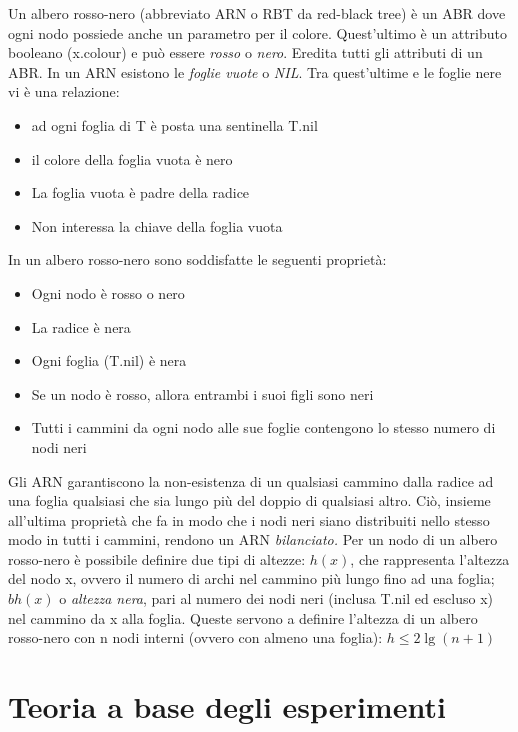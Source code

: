\documentclass[
]{article}
\begin{document}
Un albero rosso-nero (abbreviato ARN o RBT da red-black tree) è un ABR
dove ogni nodo possiede anche un parametro per il colore. Quest'ultimo è
un attributo booleano (x.colour) e può essere \emph{rosso} o
\emph{nero}. Eredita tutti gli attributi di un ABR. In un ARN esistono
le \emph{foglie vuote} o \emph{NIL}. Tra quest'ultime e le foglie nere
vi è una relazione:

\begin{itemize}
\item
  ad ogni foglia di T è posta una sentinella T.nil
\item
  il colore della foglia vuota è nero
\item
  La foglia vuota è padre della radice
\item
  Non interessa la chiave della foglia vuota~~~
\end{itemize}

In un albero rosso-nero sono soddisfatte le seguenti proprietà:

\begin{itemize}
\item
  Ogni nodo è rosso o nero
\item
  La radice è nera
\item
  Ogni foglia (T.nil) è nera
\item
  Se un nodo è rosso, allora entrambi i suoi figli sono neri
\item
  Tutti i cammini da ogni nodo alle sue foglie contengono lo stesso
  numero di nodi neri
\end{itemize}

Gli ARN garantiscono la non-esistenza di un qualsiasi cammino dalla
radice ad una foglia qualsiasi che sia lungo più del doppio di qualsiasi
altro. Ciò, insieme all'ultima proprietà che fa in modo che i nodi neri
siano distribuiti nello stesso modo in tutti i cammini, rendono un ARN
\emph{bilanciato.} Per un nodo di un albero rosso-nero è possibile
definire due tipi di altezze: \(h(x)\), che rappresenta l'altezza del
nodo x, ovvero il numero di archi nel cammino più lungo fino ad una
foglia; \(bh(x)\) o \emph{altezza nera}, pari al numero dei nodi neri
(inclusa T.nil ed escluso x) nel cammino da x alla foglia. Queste
servono a definire l'altezza di un albero rosso-nero con n nodi interni
(ovvero con almeno una foglia): \(h \leq 2 \lg(n+1)\)

\hypertarget{teoria-a-base-degli-esperimenti}{%
\section{Teoria a base degli
esperimenti}\label{teoria-a-base-degli-esperimenti}}
\end{document}
